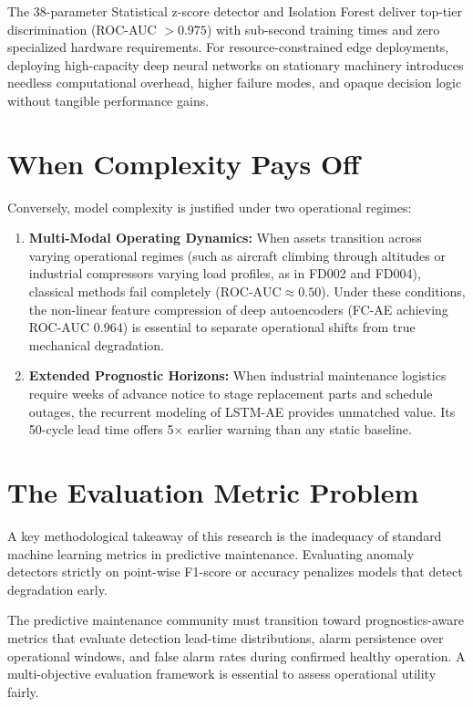 \documentclass[12pt,a4paper,oneside]{report}
\begin{document}
The 38-parameter Statistical z-score detector and Isolation Forest deliver top-tier discrimination (ROC-AUC $> 0.975$) with sub-second training times and zero specialized hardware requirements. For resource-constrained edge deployments, deploying high-capacity deep neural networks on stationary machinery introduces needless computational overhead, higher failure modes, and opaque decision logic without tangible performance gains.

\section{When Complexity Pays Off}
Conversely, model complexity is justified under two operational regimes:
\begin{enumerate}
    \item \textbf{Multi-Modal Operating Dynamics:} When assets transition across varying operational regimes (such as aircraft climbing through altitudes or industrial compressors varying load profiles, as in FD002 and FD004), classical methods fail completely ($\text{ROC-AUC} \approx 0.50$). Under these conditions, the non-linear feature compression of deep autoencoders (FC-AE achieving ROC-AUC $0.964$) is essential to separate operational shifts from true mechanical degradation.
    \item \textbf{Extended Prognostic Horizons:} When industrial maintenance logistics require weeks of advance notice to stage replacement parts and schedule outages, the recurrent modeling of LSTM-AE provides unmatched value. Its 50-cycle lead time offers 5$\times$ earlier warning than any static baseline.
\end{enumerate}

\section{The Evaluation Metric Problem}
A key methodological takeaway of this research is the inadequacy of standard machine learning metrics in predictive maintenance. Evaluating anomaly detectors strictly on point-wise F1-score or accuracy penalizes models that detect degradation early. 

The predictive maintenance community must transition toward prognostics-aware metrics that evaluate detection lead-time distributions, alarm persistence over operational windows, and false alarm rates during confirmed healthy operation. A multi-objective evaluation framework is essential to assess operational utility fairly.
\end{document}
